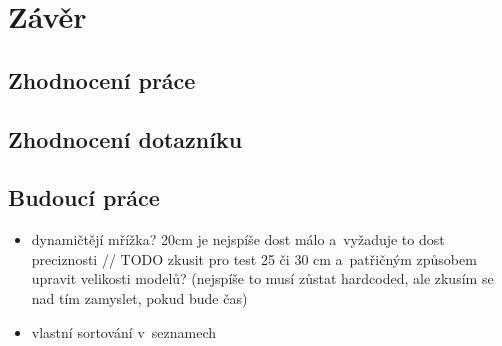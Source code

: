 
\chapter{Závěr}


\section{Zhodnocení práce}

\section{Zhodnocení dotazníku}

\section{Budoucí práce}


\begin{itemize}
	\item dynamičtějí mřížka? 20cm je nejspíše dost málo a~vyžaduje to dost preciznosti // TODO zkusit pro test 25 či 30 cm a~patřičným způsobem upravit velikosti modelů? (nejspíše to musí zůstat hardcoded, ale zkusím se nad tím zamyslet, pokud bude čas)
	\item vlastní sortování v~seznamech

\end{itemize}

